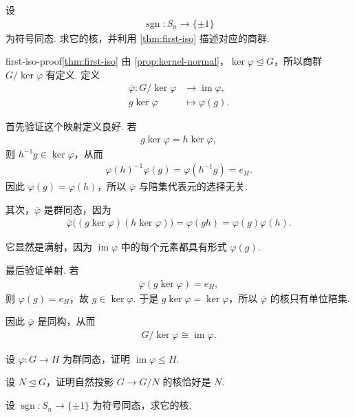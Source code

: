 \begin{problem}\label{prob:sign}
设
\begin{align*}
    \operatorname{sgn}:S_n\longrightarrow\{\pm1\}
\end{align*}
为符号同态.
求它的核，并利用 \autoref{thm:first-iso} 描述对应的商群.
\end{problem}


\begin{longproof}{first-iso-proof}{\autoref{thm:first-iso}}
由 \autoref{prop:kernel-normal}，\(\ker\varphi\trianglelefteq G\)，所以商群 \(G/\ker\varphi\) 有定义.
定义
\begin{align*}
    \overline{\varphi}:G/\ker\varphi&\longrightarrow\operatorname{im}\varphi,\\
    g\ker\varphi&\longmapsto\varphi(g).
\end{align*}

首先验证这个映射定义良好.
若
\begin{align*}
    g\ker\varphi=h\ker\varphi,
\end{align*}
则 \(h^{-1}g\in\ker\varphi\)，从而
\begin{align*}
    \varphi(h)^{-1}\varphi(g)
    =\varphi(h^{-1}g)
    =e_H.
\end{align*}
因此 \(\varphi(g)=\varphi(h)\)，所以 \(\overline{\varphi}\) 与陪集代表元的选择无关.

其次，\(\overline{\varphi}\) 是群同态，因为
\begin{align*}
    \overline{\varphi}\bigl((g\ker\varphi)(h\ker\varphi)\bigr)
    =\varphi(gh)
    =\varphi(g)\varphi(h).
\end{align*}

它显然是满射，因为 \(\operatorname{im}\varphi\) 中的每个元素都具有形式 \(\varphi(g)\).

最后验证单射.
若
\begin{align*}
    \overline{\varphi}(g\ker\varphi)=e_H,
\end{align*}
则 \(\varphi(g)=e_H\)，故 \(g\in\ker\varphi\).
于是 \(g\ker\varphi=\ker\varphi\)，所以 \(\overline{\varphi}\) 的核只有单位陪集.

因此 \(\overline{\varphi}\) 是同构，从而
\begin{align*}
    G/\ker\varphi\cong\operatorname{im}\varphi.
\end{align*}
\end{longproof}

\begin{exercises}
    \item 设 \(\varphi:G\to H\) 为群同态，证明 \(\operatorname{im}\varphi\leq H\).
    \item 设 \(N\trianglelefteq G\)，证明自然投影 \(G\to G/N\) 的核恰好是 \(N\).
    \item 设 \(\operatorname{sgn}:S_n\to\{\pm1\}\) 为符号同态，求它的核.
\end{exercises}
